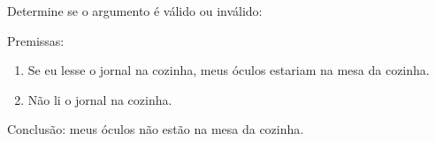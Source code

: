 \item Determine se o argumento é válido ou inválido:

     Premissas:

\begin{enumerate}
\item Se eu lesse o jornal na cozinha, meus óculos estariam na mesa da cozinha.
\item Não li o jornal na cozinha.
\end{enumerate}
		            Conclusão: meus óculos não estão na mesa da cozinha.
